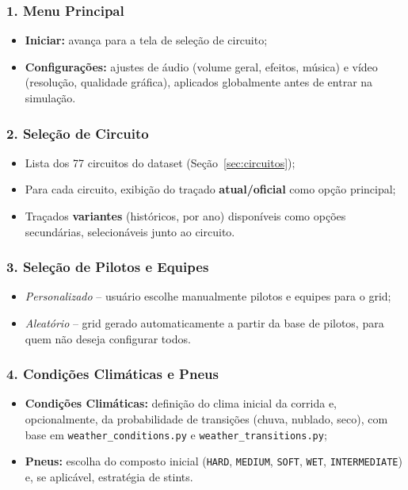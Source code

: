 \documentclass[12pt]{article}
\begin{document}
\subsubsection{1. Menu Principal}
\begin{itemize}
    \item \textbf{Iniciar:} avança para a tela de seleção de circuito;
    \item \textbf{Configurações:} ajustes de áudio (volume geral, efeitos, música) e vídeo (resolução, qualidade gráfica), aplicados globalmente antes de entrar na simulação.
\end{itemize}

\subsubsection{2. Seleção de Circuito}
\begin{itemize}
    \item Lista dos 77 circuitos do dataset (Seção~\ref{sec:circuitos});
    \item Para cada circuito, exibição do traçado \textbf{atual/oficial} como opção principal;
    \item Traçados \textbf{variantes} (históricos, por ano) disponíveis como opções secundárias, selecionáveis junto ao circuito.
\end{itemize}

\subsubsection{3. Seleção de Pilotos e Equipes}
\begin{itemize}
    \item \textit{Personalizado} -- usuário escolhe manualmente pilotos e equipes para o grid;
    \item \textit{Aleatório} -- grid gerado automaticamente a partir da base de pilotos, para quem não deseja configurar todos.
\end{itemize}

\subsubsection{4. Condições Climáticas e Pneus}
\begin{itemize}
    \item \textbf{Condições Climáticas:} definição do clima inicial da corrida e, opcionalmente, da probabilidade de transições (chuva, nublado, seco), com base em \texttt{weather\_conditions.py} e \texttt{weather\_transitions.py};
    \item \textbf{Pneus:} escolha do composto inicial (\texttt{HARD}, \texttt{MEDIUM}, \texttt{SOFT}, \texttt{WET}, \texttt{INTERMEDIATE}) e, se aplicável, estratégia de stints.
\end{itemize}
\end{document}
